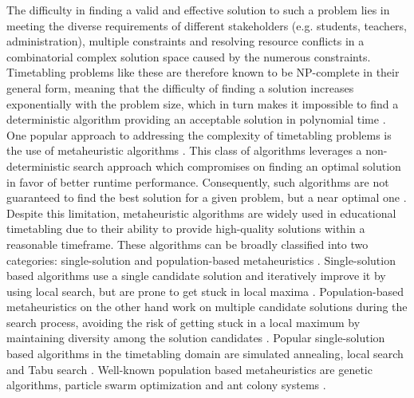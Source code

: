 \documentclass[sigconf]{acmart}
\begin{document}
The difficulty in finding a valid and effective solution to such a problem
lies in meeting the diverse requirements of different stakeholders
(e.g. students, teachers, administration), multiple constraints and resolving
resource conflicts in a combinatorial complex solution space caused by the
numerous constraints.
Timetabling problems like these are therefore known to be NP-complete in their
general form, meaning that the difficulty of finding a solution increases
exponentially with the problem size, which in turn makes it impossible to find
a deterministic algorithm providing an acceptable solution in polynomial time
\cite{Beligiannis2009}.
%
One popular approach to addressing the complexity of timetabling problems is the
use of metaheuristic algorithms \cite{Beligiannis2009}.
This class of algorithms leverages a non-deterministic search approach which
compromises on finding an optimal solution in favor of better runtime
performance. Consequently, such algorithms are not guaranteed to find
the best solution for a given problem, but a near optimal one
\cite{Affenzeller2009}.
Despite this limitation, metaheuristic algorithms are widely used in educational
timetabling due to their ability to provide high-quality solutions within
a reasonable timeframe.
These algorithms can be broadly classified into two categories: single-solution
and population-based metaheuristics \cite{Katoch2021}.
Single-solution based algorithms use a single candidate solution and iteratively
improve it by using local search, but are prone to get stuck in local maxima
\cite{Katoch2021}.
Population-based metaheuristics on the other hand work on multiple candidate
solutions during the search process, avoiding the risk of getting stuck
in a local maximum by maintaining diversity among the solution candidates
\cite{Katoch2021}.
Popular single-solution based algorithms in the timetabling domain are
simulated annealing, local search and Tabu search
\cite{Ceschia2023, Katoch2021}.
Well-known population based metaheuristics are genetic algorithms, particle
swarm optimization and ant colony systems \cite{Beligiannis2009, Katoch2021}.

\end{document}
